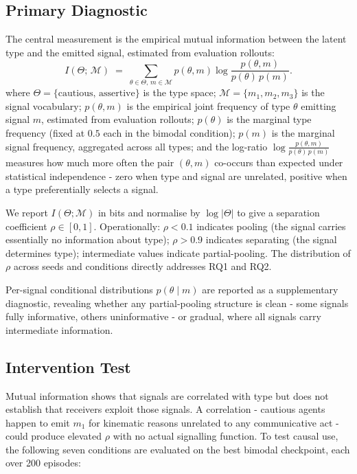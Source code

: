 \documentclass[12pt,a4paper]{article}
\begin{document}
\subsection{Primary Diagnostic}

The central measurement is the empirical mutual information between the latent type and the
emitted signal, estimated from evaluation rollouts:
\begin{equation}
    I(\Theta;\, \mathcal{M}) \;=\; \sum_{\theta \in \Theta,\, m \in \mathcal{M}}
    p(\theta, m)\log\frac{p(\theta, m)}{p(\theta)\,p(m)}.
    \label{eq:mi}
\end{equation}
where $\Theta = \{\text{cautious},\,\text{assertive}\}$ is the type space; $\mathcal{M} = \{m_1, m_2, m_3\}$ is the signal vocabulary; $p(\theta, m)$ is the empirical joint frequency of type $\theta$ emitting signal $m$, estimated from evaluation rollouts; $p(\theta)$ is the marginal type frequency (fixed at $0.5$ each in the bimodal condition); $p(m)$ is the marginal signal frequency, aggregated across all types; and the log-ratio $\log \tfrac{p(\theta,m)}{p(\theta)\,p(m)}$ measures how much more often the pair $(\theta, m)$ co-occurs than expected under statistical independence - zero when type and signal are unrelated, positive when a type preferentially selects a signal.

We report $I(\Theta; \mathcal{M})$ in bits and normalise by $\log|\Theta|$ to give a separation
coefficient $\rho \in [0, 1]$. Operationally: $\rho < 0.1$ indicates pooling (the signal carries
essentially no information about type); $\rho > 0.9$ indicates separating (the signal determines
type); intermediate values indicate partial-pooling. The distribution of $\rho$ across seeds and
conditions directly addresses RQ1 and RQ2.

Per-signal conditional distributions $p(\theta \mid m)$ are reported as a supplementary
diagnostic, revealing whether any partial-pooling structure is clean - some signals fully
informative, others uninformative - or gradual, where all signals carry intermediate information.

\subsection{Intervention Test}
\label{sec:intervention}

Mutual information shows that signals are correlated with type but does not establish that
receivers exploit those signals. A correlation - cautious agents happen to emit $m_1$
for kinematic reasons unrelated to any communicative act - could produce elevated $\rho$ with
no actual signalling function. To test causal use, the following seven conditions are evaluated
on the best bimodal checkpoint, each over 200 episodes:
\end{document}
